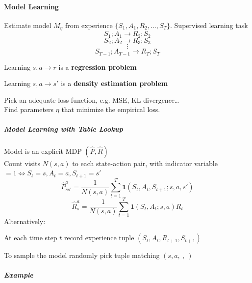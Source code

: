 \documentclass[10pt]{report}
\begin{document}
\paragraph{Model Learning} Estimate model $M_\eta$ from experience $\{S_1,A_1,R_2,\ldots,S_T\}$. Supervised learning task 
$$S_1;A_1\rightarrow R_2;S_2$$
$$S_2;A_2\rightarrow R_3;S_3$$
$$\vdots$$
$$S_{T-1};A_{T-1}\rightarrow R_T;S_T$$
\begin{list}{}{}
	\item Learning $s,a\rightarrow r$ is a \textbf{regression problem}
	\item Learning $s,a\rightarrow s'$ is a \textbf{density estimation problem}
\end{list}
Pick an adequate loss function, e.g. MSE, KL divergence\ldots\\
Find parameters $\eta$ that minimize the empirical loss.
\subparagraph{Model Learning with Table Lookup} Model is an explicit MDP $(\hat{P},\hat{R})$\\
Count visits $N(s,a)$ to each state-action pair, with indicator variable $=1\Leftrightarrow S_t=s, A_t=a, S_{t+1}=s'$
$$\hat{P}_{ss'}^a=\frac{1}{N(s,a)}\sum_{t=1}^T\mathbf{1}(S_t,A_t,S_{t+1};s,a,s')$$
$$\hat{R}_s^a=\frac{1}{N(s,a)}\sum_{t=1}^T\mathbf{1}(S_t,A_t;s,a)R_t$$
Alternatively:
\begin{list}{}{}
	\item At each time step $t$ record experience tuple $(S_t,A_t,R_{t+1},S_{t+1})$
	\item To sample the model randomly pick tuple matching $(s,a,\:,\:)$
\end{list}
\pagebreak
\subparagraph{Example} 
\end{document}
